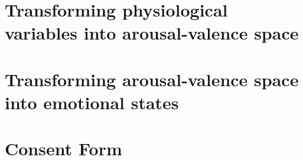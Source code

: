 \documentclass{uofsthesis-cs}
\begin{document}




\uofsappendix
\chapter{Transforming physiological variables into arousal-valence space} \label{app:phys-to-av}    
\chapter{Transforming arousal-valence space into emotional states}        \label{app:av-to-emotion} 
\chapter{Consent Form}                                                    \label{app:consent}       \noindent{}
\end{document}
